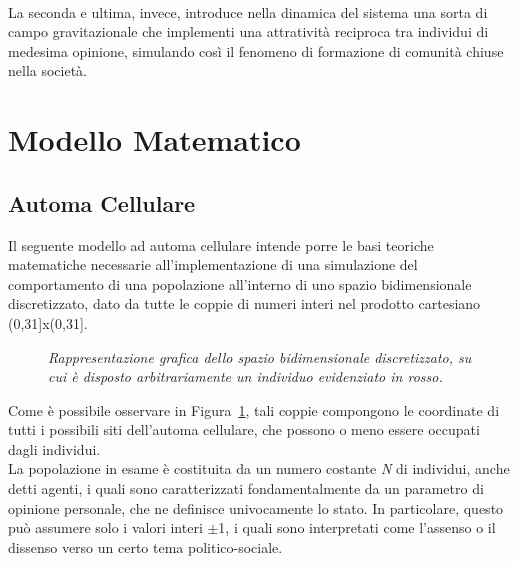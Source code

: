 \documentclass{article}
\begin{document}
\\ La seconda e ultima, invece, introduce nella dinamica del sistema una sorta di campo gravitazionale che implementi una attratività reciproca tra individui di medesima opinione, simulando così il fenomeno di formazione di comunità chiuse nella società.


\section{Modello Matematico}
\label{Sec:2}
\subsection{Automa Cellulare}
\label{Sec:2.1}
Il seguente modello ad automa cellulare intende porre le basi teoriche matematiche necessarie all'implementazione di una simulazione del comportamento di una popolazione all’interno di uno spazio bidimensionale discretizzato, dato da tutte le coppie di numeri interi nel prodotto cartesiano (0,31]x(0,31].

\begin{figure}[h]
\centering
{}
\caption{\textit{Rappresentazione grafica dello spazio bidimensionale discretizzato, su cui è disposto arbitrariamente un individuo evidenziato in rosso.}}
\label{fig:1}
\end{figure}

Come è possibile osservare in Figura~\ref{fig:1}, tali coppie compongono le coordinate di tutti i possibili siti dell'automa cellulare, che possono o meno essere occupati dagli individui.
\\ La popolazione in esame è costituita da un numero costante \textit{N} di individui, anche detti agenti, i quali sono caratterizzati fondamentalmente da un parametro di opinione personale, che ne definisce univocamente lo stato.
In particolare, questo può assumere solo i valori interi $\pm$1, i quali sono interpretati come l'assenso o il dissenso verso un certo tema politico-sociale.
\end{document}
